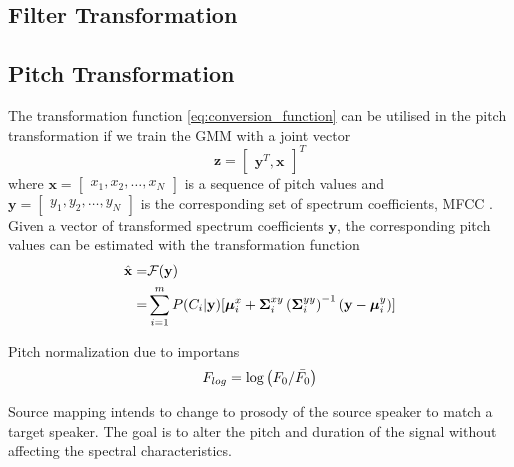 \subsection{Filter Transformation} %
\label{sub:filter_transformation}

\subsection{Pitch Transformation} %
\label{sub:pitch_transformation}



The transformation function \eqref{eq:conversion_function} can be utilised in the pitch transformation if we train the GMM with a joint vector
\begin{equation}
	\mathbf{z} = \begin{bmatrix}
		{\mathbf{y}^T,\mathbf{x}}
	\end{bmatrix}^T 
\end{equation}
where $\mathbf{x} = \begin{bmatrix}x_1,x_2,\dotsc,x_N \end{bmatrix}$ is a sequence of pitch values and $\mathbf{y} = \begin{bmatrix}y_1,y_2,\dotsc,y_N \end{bmatrix}$ is the corresponding set of spectrum coefficients, \eg MFCC \cite{najjary03new}. Given a vector of transformed spectrum coefficients $\mathbf{y}$, the corresponding pitch values can be estimated with the transformation function 
\begin{equation}
	\label{eq:pitch_transformation}
	\begin{split}
		\hat{\mathbf{x}} =& \mathcal F(\mathbf{y})\\
		=& \sum_{i=1}^{m}P(C_i \vert \mathbf{y})[\boldsymbol{\mu}_i^x + \mathbf{\Sigma}_i^{xy} \left(\mathbf{\Sigma}_i^{yy}\right)^{-1} (\mathbf{y}-\boldsymbol{\mu}_i^y)]
	\end{split}
\end{equation}

Pitch normalization due to importans
\begin{equation}
	F_{log} = \log \left(F_0/\bar{F_0}\right)
\end{equation}






Source mapping intends to change to prosody of the source speaker to match a target speaker. The goal is to alter the pitch and duration of the signal without affecting the spectral characteristics. 

